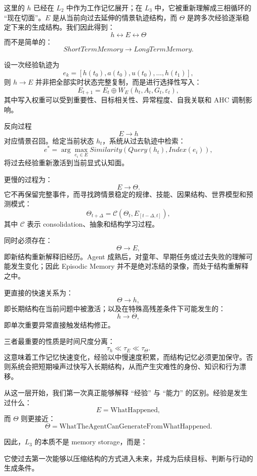 这里的 $h$ 已经在 $L_2$ 中作为工作记忆展开；在 $L_3$ 中，它被重新理解成三相循环的 ``现在切面''。$E$ 是从当前向过去延伸的情景轨迹结构，而 $\Theta$ 是跨多次经验逐渐稳定下来的生成结构。我们因此得到：
\[
\boxed{
h
\leftrightarrow
E
\leftrightarrow
\Theta
}
\]
而不是简单的：
\[
ShortTermMemory\rightarrow LongTermMemory.
\]

设一次经验轨迹为
\[
e_k
=
\left[
h(t_0),
a(t_0),
u(t_0),
\ldots,
h(t_1)
\right],
\]
则 $h\rightarrow E$ 并非把全部实时状态完整复制，而是进行选择性写入：
\[
E_{t+1}
=
E_t
\oplus
W_E
\left(
h_t,
A_t,
G_t,
\varepsilon_t
\right),
\]
其中写入权重可以受到重要性、目标相关性、异常程度、自我关联和 AHC 调制影响。

反向过程
\[
E\rightarrow h
\]
对应情景召回。给定当前状态 $h_t$，系统从过去轨迹中检索：
\[
e^*
=
\arg\max_{e_i\in E}
Similarity
\left(
Query(h_t),
Index(e_i)
\right),
\]
将过去经验重新激活到当前显式认知面。

更慢的过程为：
\[
E\rightarrow\Theta.
\]
它不再保留完整事件，而寻找跨情景稳定的规律、技能、因果结构、世界模型和预测模式：
\[
\Theta_{t+\Delta}
=
\mathcal{C}
\left(
\Theta_t,
E_{[t-\Delta,t]}
\right),
\]
其中 $\mathcal C$ 表示 consolidation、抽象和结构学习过程。

同时必须存在：
\[
\Theta\rightarrow E,
\]
即新结构重新解释旧经历。Agent 成熟后，对童年、早期任务或过去失败的理解可能发生变化；因此 Episodic Memory 并不是绝对冻结的录像，而处于结构重解释之中。

更直接的快速关系为：
\[
\Theta\rightarrow h,
\]
即长期结构在当前问题中被激活；以及在特殊高残差条件下可能发生的：
\[
h\rightarrow\Theta,
\]
即单次重要异常直接触发结构修正。

三者最重要的性质是时间尺度分离：
\[
\boxed{
\tau_h
\ll
\tau_E
\ll
\tau_\Theta.
}
\]
这意味着工作记忆快速变化，经验以中慢速度积累，而结构记忆必须更加保守。否则系统会把短期噪声过快写入长期结构，从而产生灾难性的身份、知识和行为漂移。

从这一层开始，我们第一次真正能够解释 ``经验'' 与 ``能力'' 的区别。经验是发生过什么：
\[
E=\text{WhatHappened},
\]
而 $\Theta$ 则更接近：
\[
\Theta=\text{WhatTheAgentCanGenerateFromWhatHappened}.
\]

因此，$L_3$ 的本质不是 memory storage，而是：
\begin{statementbox}
\centering
{}
\end{statementbox}
它使过去第一次能够以压缩结构的方式进入未来，并成为后续目标、判断与行动的生成条件。

